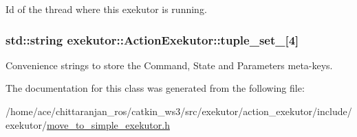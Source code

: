 \-Id of the thread where this exekutor is running. 

\hypertarget{classexekutor_1_1ActionExekutor_a22f5cde3fe83eb147ec50c2d760b2d1f}{
\subsubsection[{tuple\-\_\-set\-\_\-}]{\setlength{\rightskip}{0pt plus 5cm}std\-::string {\bf exekutor\-::\-Action\-Exekutor\-::tuple\-\_\-set\-\_\-}\mbox{[}4\mbox{]}}}\label{classexekutor_1_1ActionExekutor_a22f5cde3fe83eb147ec50c2d760b2d1f}


\-Convenience strings to store the \-Command, \-State and \-Parameters meta-\/keys. 



\-The documentation for this class was generated from the following file\-:\begin{DoxyCompactItemize}
\item 
/home/ace/chittaranjan\-\_\-ros/catkin\-\_\-ws3/src/exekutor/action\-\_\-exekutor/include/exekutor/\hyperlink{move__to__simple__exekutor_8h}{move\-\_\-to\-\_\-simple\-\_\-exekutor.\-h}\end{DoxyCompactItemize}
